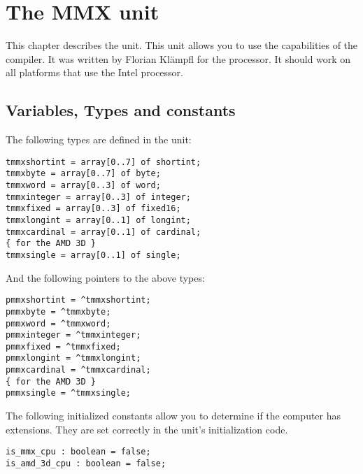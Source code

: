 %
%
%
%
%
\chapter{The MMX unit}
This chapter describes the  unit. This unit allows you to use the
 capabilities of the \fpc compiler. It was written by Florian
Kl\"ampfl for the  processor. It should work on all platforms that
use the Intel processor.
\section{Variables, Types and constants}
The following types are defined in the  unit:
\begin{verbatim}
tmmxshortint = array[0..7] of shortint;
tmmxbyte = array[0..7] of byte;
tmmxword = array[0..3] of word;
tmmxinteger = array[0..3] of integer;
tmmxfixed = array[0..3] of fixed16;
tmmxlongint = array[0..1] of longint;
tmmxcardinal = array[0..1] of cardinal;
{ for the AMD 3D }
tmmxsingle = array[0..1] of single;
\end{verbatim}
And the following pointers to the above types:
\begin{verbatim}
pmmxshortint = ^tmmxshortint;
pmmxbyte = ^tmmxbyte;
pmmxword = ^tmmxword;
pmmxinteger = ^tmmxinteger;
pmmxfixed = ^tmmxfixed;
pmmxlongint = ^tmmxlongint;
pmmxcardinal = ^tmmxcardinal;
{ for the AMD 3D }
pmmxsingle = ^tmmxsingle;
\end{verbatim}
The following initialized constants allow you to determine if the computer
has  extensions. They are set correctly in the unit's
initialization code.
\begin{verbatim}
is_mmx_cpu : boolean = false;
is_amd_3d_cpu : boolean = false;
\end{verbatim}
